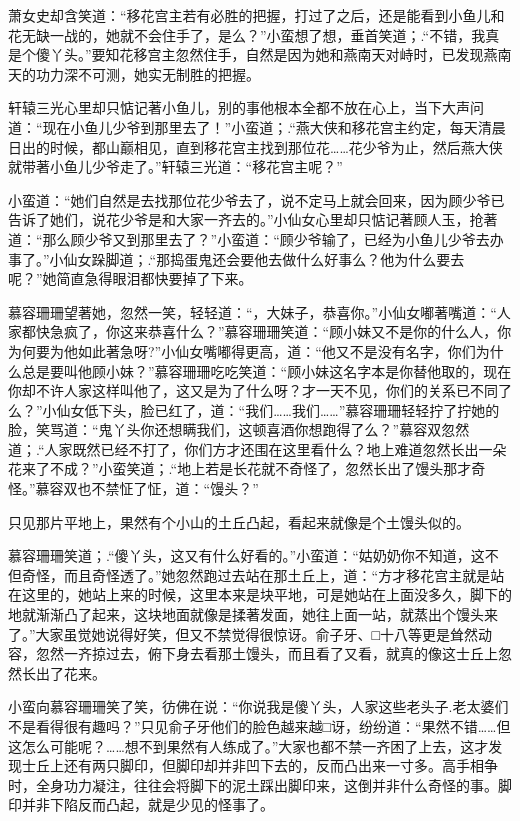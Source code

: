 \documentclass[12pt,oneside]{book}
\begin{document}
萧女史却含笑道：``移花宫主若有必胜的把握，打过了之后，还是能看到小鱼儿和花无缺一战的，她就不会住手了，是么？''小蛮想了想，垂首笑道；.``不错，我真是个傻丫头。''要知花移宫主忽然住手，自然是因为她和燕南天对峙时，已发现燕南天的功力深不可测，她实无制胜的把握。

轩辕三光心里却只惦记著小鱼儿，别的事他根本全都不放在心上，当下大声问道：``现在小鱼儿少爷到那里去了！''小蛮道；.``燕大侠和移花宫主约定，每天清晨日出的时候，都山巅相见，直到移花宫主找到那位花\ldots\ldots 花少爷为止，然后燕大侠就带著小鱼儿少爷走了。''轩辕三光道：``移花宫主呢？''

小蛮道：``她们自然是去找那位花少爷去了，说不定马上就会回来，因为顾少爷已告诉了她们，说花少爷是和大家一齐去的。''小仙女心里却只惦记著顾人玉，抢著道：``那么顾少爷又到那里去了？''小蛮道：``顾少爷输了，已经为小鱼儿少爷去办事了。''小仙女跺脚道；.``那捣蛋鬼还会要他去做什么好事么？他为什么要去呢？''她简直急得眼泪都快要掉了下来。

慕容珊珊望著她，忽然一笑，轻轻道：``，大妹子，恭喜你。''小仙女嘟著嘴道：``人家都快急疯了，你这来恭喜什么？''慕容珊珊笑道：``顾小妹又不是你的什么人，你为何要为他如此著急呀?''小仙女嘴嘟得更高，道：``他又不是没有名字，你们为什么总是要叫他顾小妹？''慕容珊珊吃吃笑道：``顾小妹这名字本是你替他取的，现在你却不许人家这样叫他了，这又是为了什么呀？才一天不见，你们的关系已不同了么？''小仙女低下头，脸已红了，道：``我们\ldots\ldots 我们\ldots\ldots{}''慕容珊珊轻轻拧了拧她的脸，笑骂道：``鬼丫头你还想瞒我们，这顿喜酒你想跑得了么？''慕容双忽然道；.``人家既然已经不打了，你们方才还围在这里看什么？地上难道忽然长出一朵花来了不成？''小蛮笑道；.``地上若是长花就不奇怪了，忽然长出了馒头那才奇怪。''慕容双也不禁怔了怔，道：``馒头？''

只见那片平地上，果然有个小山的土丘凸起，看起来就像是个土馒头似的。

慕容珊珊笑道；.``傻丫头，这又有什么好看的。''小蛮道：``姑奶奶你不知道，这不但奇怪，而且奇怪透了。''她忽然跑过去站在那土丘上，道：``方才移花宫主就是站在这里的，她站上来的时候，这里本来是块平地，可是她站在上面没多久，脚下的地就渐渐凸了起来，这块地面就像是揉著发面，她往上面一站，就蒸出个馒头来了。''大家虽觉她说得好笑，但又不禁觉得很惊讶。俞子牙、□十八等更是耸然动容，忽然一齐掠过去，俯下身去看那土馒头，而且看了又看，就真的像这士丘上忽然长出了花来。

小蛮向慕容珊珊笑了笑，彷佛在说：``你说我是傻丫头，人家这些老头子.老太婆们不是看得很有趣吗？''只见俞子牙他们的脸色越来越□讶，纷纷道：``果然不错\ldots\ldots 但这怎么可能呢？\ldots\ldots 想不到果然有人练成了。''大家也都不禁一齐困了上去，这才发现士丘上还有两只脚印，但脚印却并非凹下去的，反而凸出来一寸多。高手相争时，全身功力凝注，往往会将脚下的泥土踩出脚印来，这倒并非什么奇怪的事。脚印并非下陷反而凸起，就是少见的怪事了。
\end{document}
